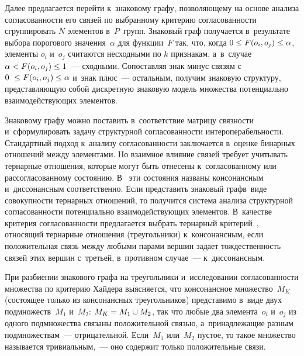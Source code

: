 \begin{multicols}{2}
     Далее предлагается перейти к~знаковому графу, поз\-во\-ля\-юще\-му на 
основе анализа со\-гла\-со\-ван\-ности его связей по вы\-бран\-но\-му критерию 
со\-гла\-со\-ван\-ности сгруп\-пи\-ро\-вать $N$ элементов в~$P$~групп. Знаковый граф 
получается в~результате выбора порогового значения~$\alpha$  для 
функции~$F$ так, что, когда $0 \hm\leq F(o_i, o_j) \hm\leq \alpha$, элементы 
$o_i$ и~$o_j$ считаются несходными по $k$ признакам, а~в~случае $\alpha \hm <  
F(o_i, o_j) \hm\leq 1$~--- сходными. Со\-по\-став\-ляя знак минус связям с~$0\hm\ 
\leq F(o_i, o_j) \hm\leq \alpha$ и~знак плюс~--- остальным, получим 
знаковую структуру, пред\-став\-ля\-ющую собой дис\-крет\-ную знаковую модель 
множества потенциально вза\-имо\-дей\-ст\-ву\-ющих элементов. 
     
     Знаковому графу можно поставить в~соответствие мат\-ри\-цу связ\-ности 
     и~сформулировать задачу структурной со\-гла\-со\-ван\-ности ин\-тер\-опе\-ра\-бель\-ности. 
Стандартный подход к~анализу \mbox{со\-гла\-со\-ван\-ности} заключается в~оценке 
бинарных отношений между элементами. Но взаимное влияние связей 
требует учитывать тернарные отношения, которые могут быть отнесены 
к~со\-гла\-со\-ван\-но\-му или рас\-со\-гла\-со\-ван\-но\-му со\-сто\-янию. В~\cite{5-dul} эти 
со\-сто\-яния названы консонансным и~диссонансным соответственно. Если 
пред\-ста\-вить знаковый граф\linebreak в~виде со\-во\-куп\-ности тернарных отношений, то 
получится сис\-те\-ма анализа структурной со\-гла\-со\-ван\-ности потенциально 
вза\-и\-мо\-дей\-ст\-ву\-ющих элементов. В~качестве критерия со\-гла\-со\-ван\-ности 
\mbox{пред\-ла\-га\-ет\-ся} вы\-брать тернарный критерий~\cite{5-dul}, относящий 
тернарные отношения (треугольники) к~консонансным, если положительная 
связь меж\-ду любыми парами вершин задает тож\-дест\-вен\-ность связей этих 
вершин с~третьей, в~про\-тив\-ном случае~--- к~диссонансным. 
     
     При разбиении знакового графа на треугольники и~исследовании 
со\-гла\-со\-ван\-ности множества по критерию Хай\-де\-ра выясняется, что 
консонансное множество~$M_K$ (со\-сто\-ящее только из консонансных 
треугольников) пред\-ста\-ви\-мо в~виде двух подмножеств~$M_1$ и~$M_2$: 
$M_K\hm= M_1\cup M_2$, так что любые два элемента~$o_i$ и~$o_j$ из 
одного подмножества связаны положительной связью, а~при\-над\-ле\-жа\-щие 
разным подмножествам~--- отрицательной. Если~$M_1$ или~$M_2$ пустое, 
то такое множество называется тривиальным,~--- оно содержит только 
положительные связи. 
     

\end{multicols}
